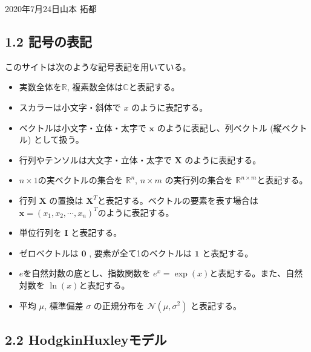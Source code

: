 \documentclass[letterpaper,10pt,english]{sphinxmanual}
\begin{document}
2020年7月24日山本 拓都


\subsection{1.2 記号の表記}
\label{\detokenize{notation:id1}}\label{\detokenize{notation::doc}}
このサイトは次のような記号表記を用いている。
\begin{itemize}
\item {} 
実数全体を\(\mathbb{R}\), 複素数全体は\(\mathbb{C}\)と表記する。

\item {} 
スカラーは小文字・斜体で \(x\) のように表記する。

\item {} 
ベクトルは小文字・立体・太字で \(\mathbf{x}\) のように表記し、列ベクトル (縦ベクトル) として扱う。

\item {} 
行列やテンソルは大文字・立体・太字で \(\mathbf{X}\) のように表記する。

\item {} 
\(n\times 1\)の実ベクトルの集合を \(\mathbb{R}^n\), \(n\times m\) の実行列の集合を \(\mathbb{R}^{n\times m}\)と表記する。

\item {} 
行列 \(\mathbf{X}\) の置換は \(\mathbf{X}^T\)と表記する。ベクトルの要素を表す場合は \(\mathbf{x} = (x_1, x_2,\cdots, x_n)^T\)のように表記する。

\item {} 
単位行列を \(\mathbf{I}\) と表記する。

\item {} 
ゼロベクトルは \(\mathbf{0}\) , 要素が全て1のベクトルは \(\mathbf{1}\) と表記する。

\item {} 
\(e\)を自然対数の底とし、指数関数を \(e^x=\exp(x)\)と表記する。また、自然対数を \(\ln(x)\)と表記する。

\item {} 
平均 \(\mu\), 標準偏差 \(\sigma\) の正規分布を \(\mathcal{N}(\mu, \sigma^2)\) と表記する。

\end{itemize}


\subsection{2.2 Hodgkin\sphinxhyphen{}Huxleyモデル}
\label{\detokenize{2-2_hodgkinhuxley:hodgkin-huxley}}\label{\detokenize{2-2_hodgkinhuxley::doc}}
\end{document}
